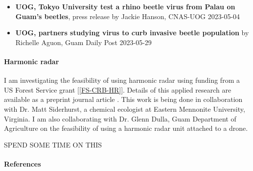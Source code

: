 \begin{refsection}
\begin{itemize}
\item \textbf{UOG, Tokyo University test a rhino beetle virus from Palau on Guam’s beetles}, press release by Jackie Hanson, CNAS-UOG 2023-05-04 \cite{hansonUOGTokyoUniversity2023}

\item \textbf{UOG, partners studying virus to curb invasive beetle population} by Richelle Aguon, Guam Daily Post 2023-05-29 \cite{postUOGPartnersStudying2023}

\end{itemize}

\paragraph{Harmonic radar}
I am investigating the feasibility of using harmonic radar using funding from a US Forest Service grant [\ref{FS-CRB-HR}]. Details of this applied research are available as a preprint journal article \cite{moore_detecting_2022}. This work is being done in collaboration with Dr. Matt Siderhurst, a chemical ecologist at Eastern Mennonite University, Virginia. I am also collaborating with Dr. Glenn Dulla, Guam Department of Agriculture on the feasibility of using a harmonic radar unit attached to a drone. 

SPEND SOME TIME ON THIS
			
%		
%
%
%
%


\paragraph{References}
\printbibliography[heading=none]

\end{refsection}


